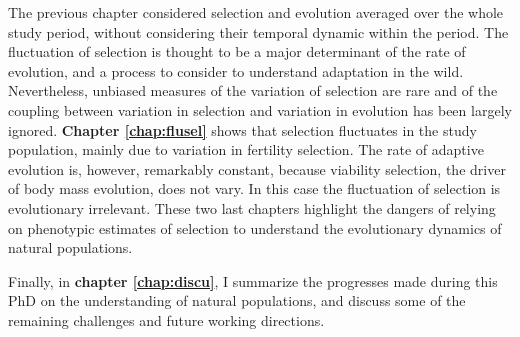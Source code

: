 The previous chapter considered selection and evolution averaged over the whole study period, without considering their temporal dynamic within the period. The fluctuation of selection is thought to be a major determinant of the rate of evolution, and a process to consider to understand adaptation in the wild. 
Nevertheless, unbiased measures of the variation of selection are rare and of the coupling between variation in selection and variation in evolution has been largely ignored. \textbf{Chapter \ref{chap:flusel}} shows that selection fluctuates in the study population, mainly due to variation in fertility selection. The rate of adaptive evolution is, however, remarkably constant, because viability selection, the driver of body mass evolution, does not vary. In this case the fluctuation of selection is evolutionary irrelevant. These two last chapters highlight the dangers of relying on phenotypic estimates of selection to understand the evolutionary dynamics of natural populations.

Finally, in \textbf{chapter \ref{chap:discu}}, I summarize the progresses made during this PhD on the understanding of natural populations, and discuss some of the remaining challenges and future working directions.

\printbibliography[heading=subbibliography]

